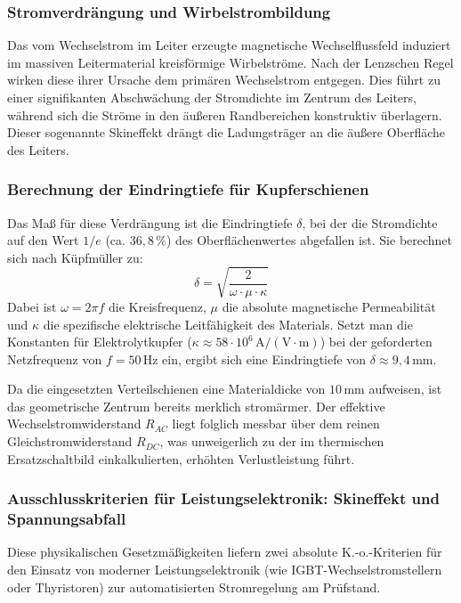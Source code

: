 \subsubsection{Stromverdrängung und Wirbelstrombildung}
Das vom Wechselstrom im Leiter erzeugte magnetische Wechselflussfeld induziert im massiven Leitermaterial kreisförmige Wirbelströme. Nach der Lenzschen Regel wirken diese ihrer Ursache dem primären Wechselstrom entgegen. Dies führt zu einer signifikanten Abschwächung der Stromdichte im Zentrum des Leiters, während sich die Ströme in den äußeren Randbereichen konstruktiv überlagern. Dieser sogenannte Skineffekt drängt die Ladungsträger an die äußere Oberfläche des Leiters.
\subsubsection{Berechnung der Eindringtiefe für Kupferschienen}
Das Maß für diese Verdrängung ist die Eindringtiefe $\delta$, bei der die Stromdichte auf den Wert $1/e$ (ca. $36,8\,\%$) des Oberflächenwertes abgefallen ist. Sie berechnet sich nach Küpfmüller zu:
\begin{equation}
    \delta = \sqrt{\frac{2}{\omega \cdot \mu \cdot \kappa}}
    \label{eq:eindringtiefe}
\end{equation}
Dabei ist $\omega = 2\pi f$ die Kreisfrequenz, $\mu$ die absolute magnetische Permeabilität und $\kappa$ die spezifische elektrische Leitfähigkeit des Materials. Setzt man die Konstanten für Elektrolytkupfer ($\kappa \approx 58 \cdot 10^6\,\text{A}/(\text{V}\cdot\text{m})$) bei der geforderten Netzfrequenz von $f = 50\,\text{Hz}$ ein, ergibt sich eine Eindringtiefe von $\delta \approx 9,4\,\text{mm}$. 

Da die eingesetzten Verteilschienen eine Materialdicke von $10\,\text{mm}$ aufweisen, ist das geometrische Zentrum bereits merklich stromärmer. Der effektive Wechselstromwiderstand $R_{AC}$ liegt folglich messbar über dem reinen Gleichstromwiderstand $R_{DC}$, was unweigerlich zu der im thermischen Ersatzschaltbild einkalkulierten, erhöhten Verlustleistung führt.
\subsubsection{Ausschlusskriterien für Leistungselektronik: Skineffekt und Spannungsabfall}
Diese physikalischen Gesetzmäßigkeiten liefern zwei absolute K.-o.-Kriterien für den Einsatz von moderner Leistungselektronik (wie IGBT-Wechselstromstellern oder Thyristoren) zur automatisierten Stromregelung am Prüfstand.

